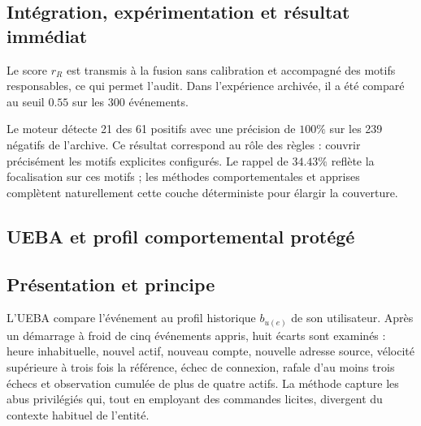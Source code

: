 \documentclass[11pt,a4paper,oneside]{report}
\theoremstyle{definition}
\theoremstyle{plain}
\begin{document}
\subsection*{Intégration, expérimentation et résultat immédiat}

Le score $r_R$ est transmis à la fusion sans calibration et accompagné des motifs responsables, ce qui permet l'audit. Dans l'expérience archivée, il a été comparé au seuil $0.55$ sur les 300 événements.

\begin{table}[H]
\centering
\caption{Résultat archivé des règles, $n=300$, seuil $0.55$.}
\label{tab:method-rules-results}
\small
{}
\end{table}

Le moteur détecte 21 des 61 positifs avec une précision de $100\%$ sur les 239
négatifs de l'archive. Ce résultat correspond au rôle des règles : couvrir
précisément les motifs explicites configurés. Le rappel de $34.43\%$ reflète la
focalisation sur ces motifs ; les méthodes comportementales et apprises
complètent naturellement cette couche déterministe pour élargir la couverture.

\subsection{UEBA et profil comportemental protégé}
\label{sec:ai-ro-ueba}

\subsection*{Présentation et principe}

L'UEBA compare l'événement au profil historique $b_{u(e)}$ de son utilisateur. Après
un démarrage à froid de cinq événements appris, huit écarts sont examinés : heure
inhabituelle, nouvel actif, nouveau compte, nouvelle adresse source, vélocité
supérieure à trois fois la référence, échec de connexion, rafale d'au moins trois
échecs et observation cumulée de plus de quatre actifs. La méthode capture les
abus privilégiés qui, tout en employant des commandes licites, divergent du contexte
habituel de l'entité.
\end{document}
